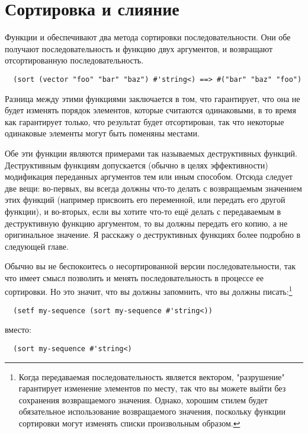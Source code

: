 \section{Сортировка и слияние}

Функции  и  обеспечивают два метода сортировки
последовательности.  Они обе получают последовательность и функцию двух аргументов, и
возвращают отсортированную последовательность.

\begin{verbatim}
  (sort (vector "foo" "bar" "baz") #'string<) ==> #("bar" "baz" "foo")
\end{verbatim}

Разница между этими функциями заключается в том, что  гарантирует, что
она не будет изменять порядок элементов, которые считаются одинаковыми, в то время как
 гарантирует только, что результат будет отсортирован, так что некоторые
одинаковые элементы могут быть поменяны местами.

Обе эти функции являются примерами так называемых деструктивных функций.  Деструктивным
функциям допускается (обычно в целях эффективности) модификация переданных аргументов тем
или иным способом.  Отсюда следует две вещи: во-первых, вы всегда должны что-то делать с
возвращаемым значением этих функций (например присвоить его переменной, или передать его
другой функции), и во-вторых, если вы хотите что-то ещё делать с передаваемым в
деструктивную функцию аргументом, то вы должны передать его копию, а не оригинальное
значение.  Я расскажу о деструктивных функциях более подробно в следующей главе.

Обычно вы не беспокоитесь о несортированной версии последовательности, так что имеет смысл
позволить  и  менять последовательность в процессе ее
сортировки.  Но это значит, что вы должны запомнить, что вы должны писать:\footnote{Когда
  передаваемая последовательность является вектором, "разрушение" гарантирует изменение
  элементов по месту, так что вы можете выйти без сохранения возвращаемого значения.
  Однако, хорошим стилем будет обязательное использование возвращаемого значения,
  поскольку функции сортировки могут изменять списки произвольным образом.}

\begin{verbatim}
  (setf my-sequence (sort my-sequence #'string<))
\end{verbatim}

вместо:

\begin{verbatim}
  (sort my-sequence #'string<)
\end{verbatim}

